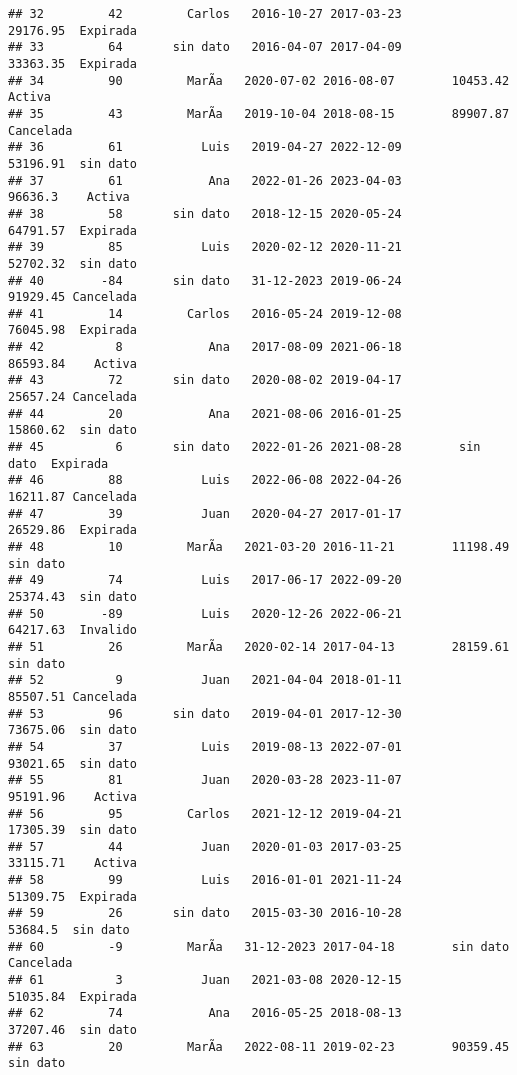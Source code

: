 \documentclass[
]{article}
\begin{document}
\begin{verbatim}
## 32         42         Carlos   2016-10-27 2017-03-23        29176.95  Expirada
## 33         64       sin dato   2016-04-07 2017-04-09        33363.35  Expirada
## 34         90         MarÃ­a   2020-07-02 2016-08-07        10453.42    Activa
## 35         43         MarÃ­a   2019-10-04 2018-08-15        89907.87 Cancelada
## 36         61           Luis   2019-04-27 2022-12-09        53196.91  sin dato
## 37         61            Ana   2022-01-26 2023-04-03         96636.3    Activa
## 38         58       sin dato   2018-12-15 2020-05-24        64791.57  Expirada
## 39         85           Luis   2020-02-12 2020-11-21        52702.32  sin dato
## 40        -84       sin dato   31-12-2023 2019-06-24        91929.45 Cancelada
## 41         14         Carlos   2016-05-24 2019-12-08        76045.98  Expirada
## 42          8            Ana   2017-08-09 2021-06-18        86593.84    Activa
## 43         72       sin dato   2020-08-02 2019-04-17        25657.24 Cancelada
## 44         20            Ana   2021-08-06 2016-01-25        15860.62  sin dato
## 45          6       sin dato   2022-01-26 2021-08-28        sin dato  Expirada
## 46         88           Luis   2022-06-08 2022-04-26        16211.87 Cancelada
## 47         39           Juan   2020-04-27 2017-01-17        26529.86  Expirada
## 48         10         MarÃ­a   2021-03-20 2016-11-21        11198.49  sin dato
## 49         74           Luis   2017-06-17 2022-09-20        25374.43  sin dato
## 50        -89           Luis   2020-12-26 2022-06-21        64217.63  Invalido
## 51         26         MarÃ­a   2020-02-14 2017-04-13        28159.61  sin dato
## 52          9           Juan   2021-04-04 2018-01-11        85507.51 Cancelada
## 53         96       sin dato   2019-04-01 2017-12-30        73675.06  sin dato
## 54         37           Luis   2019-08-13 2022-07-01        93021.65  sin dato
## 55         81           Juan   2020-03-28 2023-11-07        95191.96    Activa
## 56         95         Carlos   2021-12-12 2019-04-21        17305.39  sin dato
## 57         44           Juan   2020-01-03 2017-03-25        33115.71    Activa
## 58         99           Luis   2016-01-01 2021-11-24        51309.75  Expirada
## 59         26       sin dato   2015-03-30 2016-10-28         53684.5  sin dato
## 60         -9         MarÃ­a   31-12-2023 2017-04-18        sin dato Cancelada
## 61          3           Juan   2021-03-08 2020-12-15        51035.84  Expirada
## 62         74            Ana   2016-05-25 2018-08-13        37207.46  sin dato
## 63         20         MarÃ­a   2022-08-11 2019-02-23        90359.45  sin dato

\end{verbatim}
\end{document}
